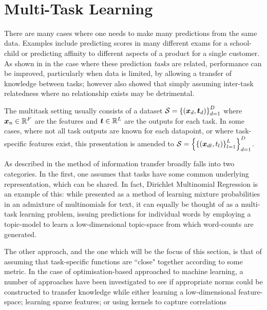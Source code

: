 \

\section{Multi-Task Learning}

There are many cases where one needs to make many predictions from the same data. Examples include predicting scores in many different exams for a school-child\cite{Bonilla2008}\cite{Evgeniou2005} or predicting affinity to different aspects of a product for a single customer\cite{Allenby1999}. As shown in \cite{Caruana1997} in the case where these prediction \emph{tasks} are related, performance can be improved, particularly when data is limited, by allowing a transfer of knowledge between tasks; however \cite{Caruana1997} also showed that simply assuming inter-task relatedness where no relationship exists may be detrimental.

The multitask setting usually consists of a dataset $\mathcal{S} = \left\{\left(\bm x_d, \bm t_d\right)\right\}_{d=1}^D$ where $\bm x_n \in { \mathbb{R}^{F} }$ are the features and $\bm t \in { \mathbb{R}^{L} }$ are the outputs for each task. In some cases, where not all task outputs are known for each datapoint, or where task-specific features exist, this presentation is amended to $\mathcal{S} = \left\{\left\{\left(\bm x_{dl}, t_l\right)\right\}_{l=1}^L\right\}_{d=1}^D$. 

As described in\cite{Argyriou2005} the method of information transfer broadly falls into two categories. In the first, one assumes that tasks have some common underlying representation, which can be shared\cite{Caruana1997}. In fact, Dirichlet Multinomial Regression\cite{Mimno2008} is an example of this: while presented as a method of learning mixture probabilities in an admixture of multinomials for text, it can equally be thought of as a multi-task learning problem, issuing predictions for individual words by employing a topic-model to learn a low-dimensional topic-space from which word-counts are generated. 

The other approach, and the one which will be the focus of this section, is that of assuming that task-specific functions are ``close" together according to some metric. In the case of optimisation-based approached to machine learning, a number of approaches have been investigated to see if appropriate norms could be constructed to transfer knowledge while either learning a low-dimensional feature-space\cite{argyriou2007spectral}; learning sparse features\cite{Argyriou2005}; or using kernels to capture correlations\cite{Evgeniou2005}

